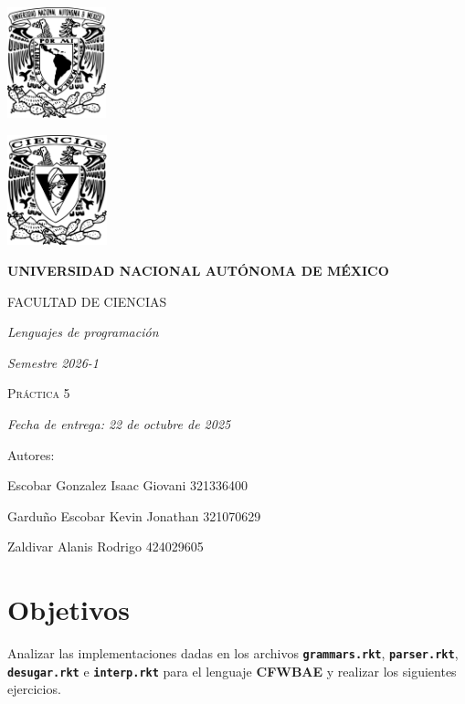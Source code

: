 \documentclass[11pt]{article}
\begin{document}
\begin{titlepage}
    \centering
    \vspace{2cm}
    {\includegraphics[height=3.2cm]{../logo_unam.png}}
    \hfill
    {\includegraphics[height=3.2cm]{../logo_fc.png}\par}
    \vspace{1cm}
    {\bfseries\LARGE UNIVERSIDAD NACIONAL AUTÓNOMA DE MÉXICO \par}
    \vspace{0.7cm}
    {\scshape\Large FACULTAD DE CIENCIAS \par}
    \vspace{1cm}
    {\itshape\Large Lenguajes de programación \par}
    \vspace{0.5cm}
    {\itshape\Large Semestre 2026-1 \par}
    \vspace{2cm}
    {\scshape\Huge Práctica 5 \par}
    \vspace{1cm}
    {\itshape\Large Fecha de entrega: 22 de octubre de 2025 \par}
    \vspace{2cm}
    {\Large Autores: \par}
    \vspace{0.4cm}
    {\Large Escobar Gonzalez Isaac Giovani \hspace{1cm} 321336400 \par}
    {\Large Garduño Escobar Kevin Jonathan \hspace{0.5cm} 321070629 \par}
    {\Large Zaldivar Alanis Rodrigo \hspace{2.75cm} 424029605 \par}
\end{titlepage}
\section{Objetivos}
Analizar las implementaciones dadas en los archivos \texttt{\textbf{grammars.rkt}}, \texttt{\textbf{parser.rkt}}, \texttt{\textbf{desugar.rkt}} e \texttt{\textbf{interp.rkt}} para el lenguaje \textbf{CFWBAE} y realizar los siguientes ejercicios.
\end{document}
